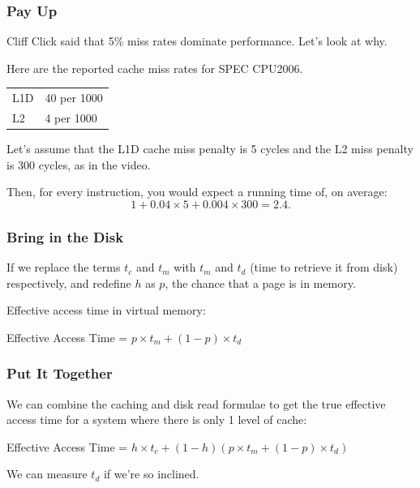 \begin{frame}
\frametitle{Pay Up}

Cliff Click said that 5\% miss rates dominate performance. Let's look at why.

Here are the reported cache miss rates for SPEC CPU2006.

\begin{center}
\begin{tabular}{ll}
L1D & 40 per 1000 \\
L2 & 4 per 1000
\end{tabular}
\end{center}

Let's assume that the L1D cache miss penalty is 5 cycles and the L2 miss penalty is
300 cycles, as in the video. 

Then, for every instruction, you would expect a running
time of, on average:
\[ 1 + 0.04 \times 5 + 0.004 \times 300 = 2.4. \]

\end{frame}



\begin{frame}
\frametitle{Bring in the Disk}

If we replace the terms $t_{c}$ and $t_{m}$ with $t_{m}$ and $t_{d}$ (time to retrieve it from disk) respectively, and redefine $h$ as $p$, the chance that a page is in memory.

Effective access time in virtual memory: 

\begin{center}
	Effective Access Time = $ p \times t_{m} + (1 - p) \times t_{d}$
\end{center}


\end{frame}



\begin{frame}
\frametitle{Put It Together}

We can combine the caching and disk read formulae to get the true effective access time for a system where there is only 1 level of cache:

\begin{center}
	Effective Access Time = $ h \times t_{c} + (1 - h) ( p \times t_{m} + (1 - p) \times t_{d})$
\end{center}

We can measure $t_{d}$ if we're so inclined.

\end{frame}




